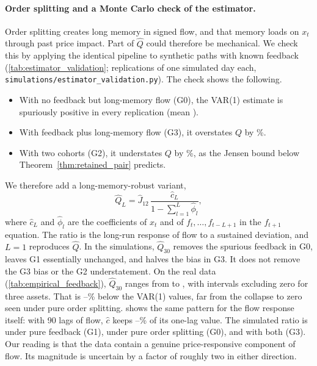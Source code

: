 \documentclass[10pt,twocolumn,letterpaper]{article}
\theoremstyle{definition}
\theoremstyle{remark}
\begin{document}
\paragraph{Order splitting and a Monte Carlo check of the estimator.} Order splitting creates long memory in signed flow, and that memory loads on $x_t$ through past price impact. Part of $\hat Q$ could therefore be mechanical. We check this by applying the identical pipeline to synthetic paths with known feedback (\cref{tab:estimator_validation}; \ValReps{} replications of one simulated day each, \texttt{simulations/estimator\_validation.py}). The check shows the following.
\begin{itemize}
 \item With no feedback but long-memory flow (G0), the VAR(1) estimate is spuriously positive in every replication (mean \ValGzeroQ).
 \item With feedback plus long-memory flow (G3), it overstates $Q$ by \ValGthreeBias\%.
 \item With two cohorts (G2), it understates $Q$ by \ValGtwoBias\%, as the Jensen bound below Theorem~\ref{thm:retained_pair} predicts.
\end{itemize}
We therefore add a long-memory-robust variant,
\begin{equation}
 \hat Q_L=\hat J_{12}\,\frac{\hat c_L}{1-\sum_{l=1}^L\hat\phi_l},
 \label{eq:Q_robust}
\end{equation}
where $\hat c_L$ and $\hat\phi_l$ are the coefficients of $x_t$ and of $f_t,\ldots,f_{t-L+1}$ in the $f_{t+1}$ equation. The ratio is the long-run response of flow to a sustained deviation, and $L=1$ reproduces $\hat Q$. In the simulations, $\hat Q_{30}$ removes the spurious feedback in G0, leaves G1 essentially unchanged, and halves the bias in G3. It does not remove the G3 bias or the G2 understatement. On the real data (\cref{tab:empirical_feedback}), $\hat Q_{30}$ ranges from \EmpQrobMin{} to \EmpQrobMax{}, with intervals excluding zero for \EmpQrobAllPos{} three assets. That is \EmpQrobRedMin--\EmpQrobRedMax\% below the VAR(1) values, far from the collapse to zero seen under pure order splitting.  shows the same pattern for the flow response itself: with 90 lags of flow, $\hat c$ keeps \EmpCratioMin--\EmpCratioMax\% of its one-lag value. The simulated ratio is \ValRatioGone{} under pure feedback (G1), \ValRatioGzero{} under pure order splitting (G0), and \ValRatioGthree{} with both (G3). Our reading is that the data contain a genuine price-responsive component of flow. Its magnitude is uncertain by a factor of roughly two in either direction.
\end{document}
